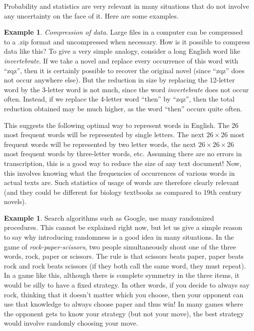 \documentclass[preprint,  11pt]{amsart}
\newcommand{\para}[1]{\vspace{4mm}\noindent{\bfseries #1:}}
\theoremstyle{plain} %
\theoremstyle{definition} %
\newtheorem{example}[theorem]{Example}
\begin{document}
\para{However...} Probability and statistics are very relevant in many situations that do not involve any uncertainty on the face of it. Here are some examples.
\begin{example} {\em Compression of data}. Large files in a computer can be compressed to a .zip format and uncompressed when necessary. How is it possible to compress data like this? To give a very simple analogy, consider a long English word like {\em invertebrate}. If we take a novel and replace every occurrence of this word with ``zqz'', then  it is certainly possible to recover the original novel (since ``zqz'' does not occur anywhere else). But the reduction in size by replacing the 12-letter word by the 3-letter word is not much, since the word {\em invertebrate} does not occur often. Instead, if we replace the 4-letter word ``then'' by ``zqz'', then the total reduction obtained may be much higher, as the word ``then'' occurs quite often. 

This suggests the following optimal way to represent words in English. The 26 most frequent words will be represented by single letters. The next $26\times 26$ most frequent words will be represented by two letter words, the next $26\times 26\times 26$ most frequent words by three-letter words, etc. Assuming there are no errors in transcription, this is a good way to reduce the size of any text document! Now, this involves knowing what the frequencies of occurrences of various words in actual texts are. Such statistics of usage of words are therefore clearly relevant (and they could be different for biology textbooks as compared to 19th century novels). 
\end{example}
\begin{example} Search algorithms such as Google, use many randomized procedures. This cannot be explained right now, but let us give a simple reason to say why introducing randomness is a good idea in many situations. In the game of {\em rock-paper-scissors}, two people simultaneously shout one of the three words, rock, paper or scissors. The rule is that scissors beats paper, paper beats rock and rock beats scissors (if they both call the same word, they must repeat). In a game like this, although there is complete symmetry in the three items, it would be silly to have a fixed strategy. In other words, if you decide to always say rock, thinking that it doesn't matter which you choose, then your opponent can use that knowledge to always choose paper and thus win! In many games where the opponent gets to know your strategy (but not your move), the best strategy would involve  randomly choosing your move.
\end{example}
\end{document}
